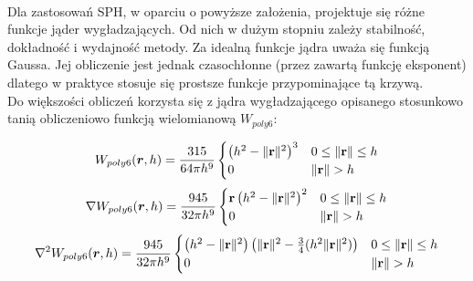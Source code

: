 \paragraph{}
Dla zastosowań SPH, w oparciu o powyższe założenia, projektuje się różne funkcje jąder wygładzających. Od nich w dużym stopniu zależy stabilność, dokładność i wydajność metody. Za idealną funkcje jądra uważa się funkcją Gaussa. Jej obliczenie jest jednak czasochłonne (przez zawartą funkcję eksponent) dlatego w praktyce stosuje się prostsze funkcje przypominające tą krzywą.\\
\indent Do większości obliczeń korzysta się z jądra wygładzającego opisanego stosunkowo tanią obliczeniowo funkcją wielomianową $W_{poly6}$:

\begin{equation}
W_{poly6}(\boldsymbol{r}, h) = {315 \over 64 \pi h^9}
\begin{cases}
\left(h^2 - \| \mathbf{r} \|^2\right)^3 & 0 \le \| \mathbf{r} \| \le h \\
0 & \| \mathbf{r} \| > h
\end{cases}
\end{equation}
\begin{equation}
\nabla W_{poly6}(\boldsymbol{r}, h) = {945 \over 32 \pi h^9}
\begin{cases}
\mathbf{r} \left(h^2 - \| \mathbf{r} \|^2\right)^2 & 0 \le \| \mathbf{r} \| \le h \\
0 & \| \mathbf{r} \| > h
\end{cases}
\end{equation}
\begin{equation}
\nabla^2 W_{poly6}(\boldsymbol{r}, h) = {945 \over 32 \pi h^9}
\begin{cases}
\left(h^2 - \| \mathbf{r} \|^2\right)\left(\| \mathbf{r} \|^2 - {3 \over 4}(h^2 \| \mathbf{r} \|^2)\right) & 0 \le \| \mathbf{r} \| \le h \\
0 & \| \mathbf{r} \| > h
\end{cases}
\end{equation}

